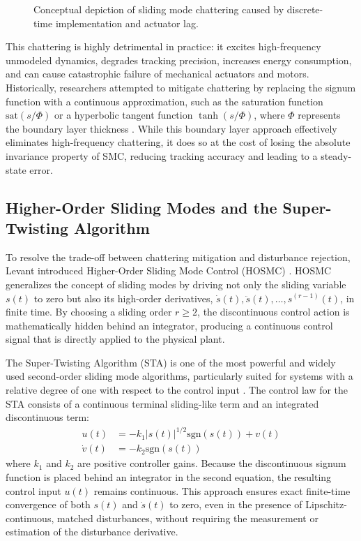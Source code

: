 \begin{figure}[h!]
\centering
{}
\caption{Conceptual depiction of sliding mode chattering caused by discrete-time implementation and actuator lag.}
\label{fig:chattering_diagram}
\end{figure}

This chattering is highly detrimental in practice: it excites high-frequency unmodeled dynamics, degrades tracking precision, increases energy consumption, and can cause catastrophic failure of mechanical actuators and motors. Historically, researchers attempted to mitigate chattering by replacing the signum function with a continuous approximation, such as the saturation function $\text{sat}(s/\Phi)$ or a hyperbolic tangent function $\tanh(s/\Phi)$, where $\Phi$ represents the boundary layer thickness \cite{ref_11}. While this boundary layer approach effectively eliminates high-frequency chattering, it does so at the cost of losing the absolute invariance property of SMC, reducing tracking accuracy and leading to a steady-state error.

\subsection{Higher-Order Sliding Modes and the Super-Twisting Algorithm}
To resolve the trade-off between chattering mitigation and disturbance rejection, Levant introduced Higher-Order Sliding Mode Control (HOSMC) \cite{ref_6, ref_8, ref_20}. HOSMC generalizes the concept of sliding modes by driving not only the sliding variable $s(t)$ to zero but also its high-order derivatives, $\dot{s}(t), \ddot{s}(t), \dots, s^{(r-1)}(t)$, in finite time. By choosing a sliding order $r \geq 2$, the discontinuous control action is mathematically hidden behind an integrator, producing a continuous control signal that is directly applied to the physical plant.

The Super-Twisting Algorithm (STA) is one of the most powerful and widely used second-order sliding mode algorithms, particularly suited for systems with a relative degree of one with respect to the control input \cite{ref_7, ref_30}. The control law for the STA consists of a continuous terminal sliding-like term and an integrated discontinuous term:
\begin{align}
u(t) &= -k_1 |s(t)|^{1/2} \text{sgn}(s(t)) + v(t) \\
\dot{v}(t) &= -k_2 \text{sgn}(s(t))
\end{align}
where $k_1$ and $k_2$ are positive controller gains. Because the discontinuous signum function is placed behind an integrator in the second equation, the resulting control input $u(t)$ remains continuous. This approach ensures exact finite-time convergence of both $s(t)$ and $\dot{s}(t)$ to zero, even in the presence of Lipschitz-continuous, matched disturbances, without requiring the measurement or estimation of the disturbance derivative.

